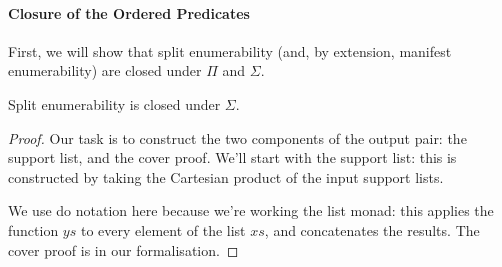 \paragraph{Closure of the Ordered Predicates}
First, we will show that split enumerability (and, by extension, manifest
enumerability) are closed under \(\Pi\) and \(\Sigma\).

\begin{lemma}\label{split-enum-sigma}
  Split enumerability is closed under \(\Sigma\).
\end{lemma}
\begin{proof}
  Our task is to construct the two components of the output pair: the support
  list, and the cover proof.
  We'll start with the support list: this is constructed by taking the Cartesian
  product of the input support lists.
  \begin{multicols}{2}
  \end{multicols}
  We use do notation here because we're working the list monad: this applies the
  function \(ys\) to every element of the list \(xs\), and concatenates
  the results.
  The cover proof is in our formalisation.
\end{proof}

